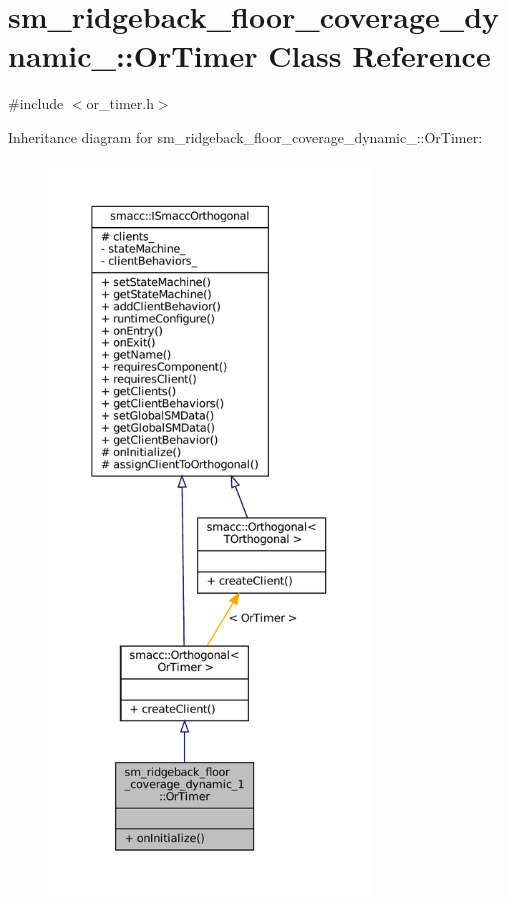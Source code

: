 \hypertarget{classsm__ridgeback__floor__coverage__dynamic__1_1_1OrTimer}{}\section{sm\+\_\+ridgeback\+\_\+floor\+\_\+coverage\+\_\+dynamic\+\_\+:\+:Or\+Timer Class Reference}
\label{classsm__ridgeback__floor__coverage__dynamic__1_1_1OrTimer}


{\ttfamily \#include $<$or\+\_\+timer.\+h$>$}



Inheritance diagram for sm\+\_\+ridgeback\+\_\+floor\+\_\+coverage\+\_\+dynamic\+\_\+:\+:Or\+Timer\+:
\nopagebreak
\begin{figure}[H]
\begin{center}
\leavevmode
\includegraphics[height=550pt]{classsm__ridgeback__floor__coverage__dynamic__1_1_1OrTimer__inherit__graph}
\end{center}
\end{figure}


